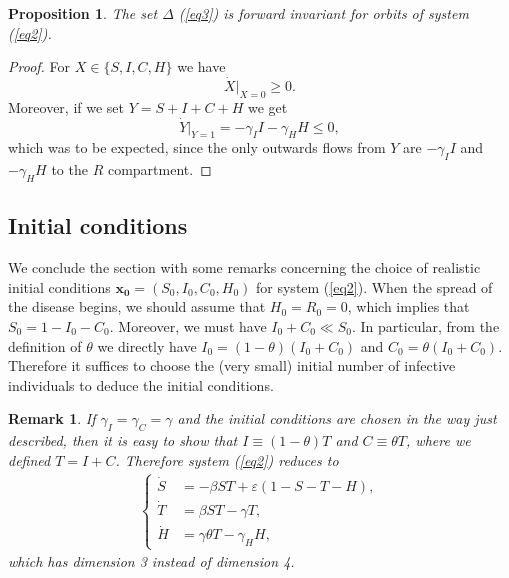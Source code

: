 \documentclass[11pt,reqno]{amsart}
\newtheorem{proposition}{Proposition}
\theoremstyle{boldremark}
\newtheorem{remark}{Remark}
\begin{document}
\begin{proposition}
    The set $\Delta$ (\ref{eq3}) is forward invariant for orbits of system (\ref{eq2}). 
\end{proposition}
\begin{proof}
    For $X \in \{S,I,C,H\}$ we have 
    \begin{equation*}
        \dot{X}|_{X=0} \ge 0.
    \end{equation*}
    Moreover, if we set $Y=S+I+C+H$ we get 
    \begin{equation*}
        \dot{Y}|_{Y=1} = - \gamma_I I - \gamma_H H \le 0, 
    \end{equation*}
    which was to be expected, since the only outwards flows from $Y$ are $-\gamma_I I $ and $-\gamma_H H$ to the $R$ compartment. 
\end{proof}

\subsection{Initial conditions} \label{subsec1}

\noindent We conclude the section with some remarks concerning the choice of realistic initial conditions $\mathbf{x_0}=(S_0, I_0, C_0, H_0)$ for system (\ref{eq2}). When the spread of the disease begins, we should assume that $H_0=R_0=0$, which implies that $S_0=1-I_0-C_0$. Moreover, we must have $I_0+C_0 \ll S_0$. In particular, from the definition of $\theta$ we directly have $I_0=(1-\theta)(I_0+C_0)$ and $C_0=\theta(I_0+C_0)$. Therefore it suffices to choose the (very small) initial number of infective individuals to deduce the initial conditions.     

\begin{remark}
If $\gamma_I=\gamma_C=\gamma$ and the initial conditions are chosen in the way just described, then it is easy to show that $I \equiv (1-\theta) T$ and $C \equiv \theta T$, where we defined $T=I+C$. Therefore system (\ref{eq2}) reduces to 
\begin{align} \label{eqsimple}
\left\{
\begin{aligned}
    \dot{S} &= -\beta S T + \varepsilon (1-S-T-H), \\ 
    \dot{T} &= \beta S T - \gamma T, \\ 
    \dot{H} &= \gamma \theta T - \gamma_H H ,
\end{aligned}
\right.
\end{align}
which has dimension 3 instead of dimension 4. 
\end{remark}
\end{document}
